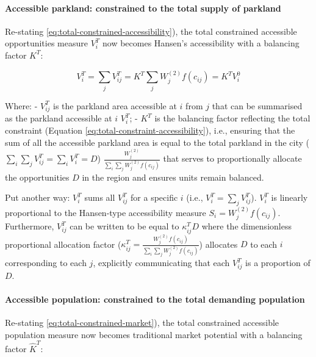 \documentclass[
11pt, %
oneside, %
english, %
singlespacing, %
]{macthesis} %
\begin{document}
\paragraph{Accessible parkland: constrained to the total supply of parkland}\label{accessible-parkland-constrained-to-the-total-supply-of-parkland}

Re-stating \ref{eq:total-constrained-accessibility}), the total constrained accessible opportunities measure \(V^T_{i}\) now becomes Hansen's accessibility with a balancing factor \(K^T\):

\begin{equation}
\label{eq:total-constrained-accessibility}
V^T_i = \sum_j V^T_{ij} = K^T \sum_j W^{(2)}_j f(c_{ij}) = K^T V^0_i
\end{equation} 

Where:
- \(V^T_{ij}\) is the parkland area accessible at \(i\) from \(j\) that can be summarised as the parkland accessible at \(i\) \(V^T_{i}\);
- \(K^T\) is the balancing factor reflecting the total constraint (Equation \ref{eq:total-constraint-accessibility}), i.e., ensuring that the sum of all the accessible parkland area is equal to the total parkland in the city (\(\sum_i\sum_j V^T_{ij} = \sum_i V^T_{i} = D\)) \(\frac{W^{(2)}_j}{\sum_i\sum_j W^{(2)}_jf(c_{ij})}\) that serves to proportionally allocate the opportunities \(D\) in the region and ensures units remain balanced.

Put another way: \(V^T_i\) sums all \(V^T_{ij}\) for a specific \(i\) (i.e., \(V^T_i = \sum_j V^T_{ij}\)). \(V^T_i\) is linearly proportional to the Hansen-type accessibility measure \(S_i = W^{(2)}_jf(c_{ij})\). Furthermore, \(V_{ij}^T\) can be written to be equal to \(\kappa_{ij}^T D\) where the dimensionless proportional allocation factor (\(\kappa_{ij}^T = \frac{W_j^{(2)} f(c_{ij})}{\sum_i\sum_j W^{(2)}_jf(c_{ij})}\)) allocates \(D\) to each \(i\) corresponding to each \(j\), explicitly communicating that each \(V_{ij}^T\) is a proportion of \(D\).

\paragraph{Accessible population: constrained to the total demanding population}\label{accessible-population-constrained-to-the-total-demanding-population}

Re-stating \ref{eq:total-constrained-market}), the total constrained accessible population measure now becomes traditional market potential with a balancing factor \(\hat K^T\):
\end{document}
